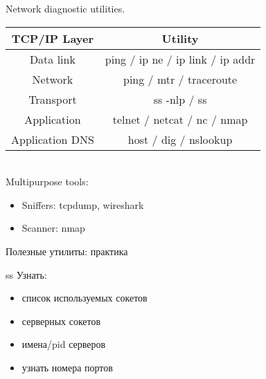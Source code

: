 \begin{frame}{Network diagnostic utilities.}
  \begin{tabular}{ | c | c | }
    \hline
    TCP/IP Layer & Utility \\ \hline 
    Data link & ping / ip ne / ip link / ip addr \\ \hline
    Network & ping / mtr / traceroute \\ \hline
    Transport &  ss -nlp / ss \\ \hline
    Application & telnet / netcat / nc / nmap  \\ \hline
    Application DNS & host / dig / nslookup  \\ \hline
  \end{tabular}
    \\
   Multipurpose tools:
		\begin{itemize}
			\item Sniffers: tcpdump, wireshark
			\item Scanner: nmap
		\end{itemize}

\end{frame}

\begin{frame}{Полезные утилиты: практика}
		\begin{block}{ss}
			Узнать:
			\begin{itemize}
				\item список используемых сокетов
				\item серверных сокетов
				\item имена/pid серверов
				\item узнать номера портов
			\end{itemize}
		\end{block}
\end{frame}


